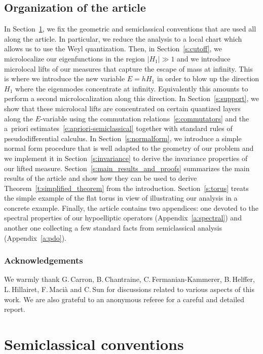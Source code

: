 \documentclass[10pt]{amsart}
\theoremstyle{plain}
\theoremstyle{definition}
\theoremstyle{remark}
\begin{document}
\subsection{Organization of the article}
In Section~\ref{s:expression}, we fix the geometric and semiclassical conventions that are used all along the article. In particular, we reduce the analysis to a local chart which allows us to use the Weyl quantization. Then, in Section~\ref{s:cutoff}, we microlocalize our eigenfunctions in the region $|H_1|\gg 1$ and we introduce microlocal lifts of our measures that capture the escape of mass at infinity. This is where we introduce the new variable $E=hH_1$ in order to blow up the direction $H_1$ where the eigenmodes concentrate at infinity. Equivalently this amounts to perform a second microlocalization along this direction. In Section~\ref{s:support}, we show that these microlocal lifts are concentrated on certain quantized layers along the $E$-variable using the commutation relations~\eqref{e:commutators} and the a~priori estimates~\eqref{e:apriori-semiclassical} together with standard rules of pseudodifferential calculus. In Section~\ref{s:normalform}, we introduce a simple normal form procedure that is well adapted to the geometry of our problem and we implement it in Section~\ref{s:invariance} to derive the invariance properties of our lifted measure. Section~\ref{s:main_results_and_proofs} summarizes the main results of the article and show how they can be used to derive Theorem~\ref{t:simplified_theorem} from the introduction. Section~\ref{s:torus} treats the simple example of the flat torus in view of illustrating our analysis in a concrete example. Finally, the article contains two appendices: one devoted to the spectral properties of our hypoelliptic operators (Appendix~\ref{a:spectral}) and another one collecting a few standard facts from semiclassical analysis (Appendix~\ref{a:pdo}).

\subsubsection*{Acknowledgements}
We warmly thank G.\,Carron, B.\,Chantraine, C.\,Fermanian-Kammerer, B.\,Helffer, L.\,Hillairet, F.\,Macià and C.\,Sun for discussions related to various aspects of this work. We are also grateful to an anonymous referee for a careful and detailed report.

\section{Semiclassical conventions}\label{s:expression}
\end{document}
